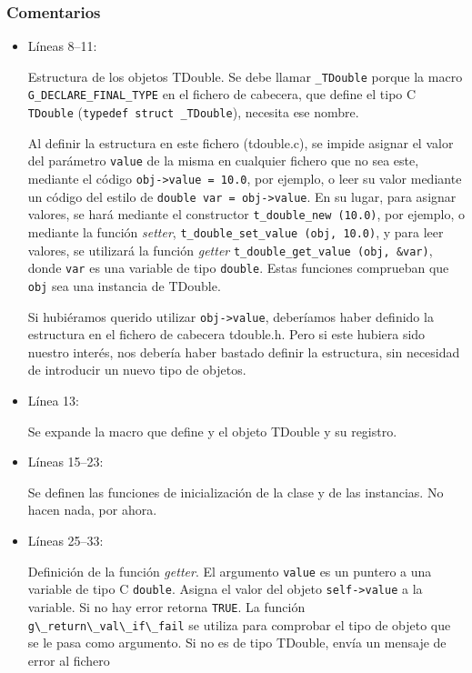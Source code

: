 \subsubsection{Comentarios}
\begin{itemize}
\item Líneas 8--11:\par
  Estructura de los objetos \textsf{TDouble}. Se debe llamar \texttt{\_TDouble} porque  la macro 
  \texttt{G\_DECLARE\_FINAL\_TYPE} en el fichero de cabecera, que define el tipo C
  \texttt{TDouble} (\texttt{typedef struct \_TDouble}), necesita ese nombre.
  \par
  Al definir la estructura en este fichero (\textsf{tdouble.c}), se impide asignar el valor del parámetro
  \texttt{value} de la misma en cualquier fichero que no sea este, mediante el código
  \texttt{obj->value = 10.0}, por ejemplo, o leer su valor mediante un código del estilo de
  \texttt{double var = obj->value}. En su lugar, para asignar valores, se hará mediante el constructor
  \texttt{t\_double\_new (10.0)}, por ejemplo, o mediante la función \emph{setter},
  \texttt{t\_double\_set\_value (obj, 10.0)}, y para leer valores, se utilizará la función \emph{getter}
  \texttt{t\_double\_get\_value (obj, \&var)}, donde \texttt{var} es una variable de tipo \texttt{double}.
  Estas funciones comprueban que \texttt{obj} sea una instancia de \textsf{TDouble}.
  \par
  Si hubiéramos querido utilizar \texttt{obj->value}, deberíamos haber definido la estructura en el
  fichero de cabecera \textsf{tdouble.h}. Pero si este hubiera sido nuestro interés, nos debería
  haber bastado definir la estructura, sin necesidad de introducir un nuevo tipo de objetos.
\item Línea 13:\par
  Se expande la macro que define y  el objeto \textsf{TDouble} y su registro.
\item Líneas 15--23:\par
  Se definen las funciones de inicialización de la clase y de las instancias. No hacen nada, por ahora.
\item Líneas 25--33:\par
  Definición de la función \textit{getter}. El argumento \texttt{value} es un puntero a una variable de tipo C
  \texttt{double}. Asigna el valor del objeto \texttt{self->value} a la variable. Si no hay error retorna \texttt{TRUE}.
  La función \passthrough{\lstinline!g\_return\_val\_if\_fail!} se utiliza para comprobar el tipo de objeto que
  se le pasa como argumento. Si no es de tipo \textsf{TDouble}, envía un mensaje de error al fichero

\end{itemize}

